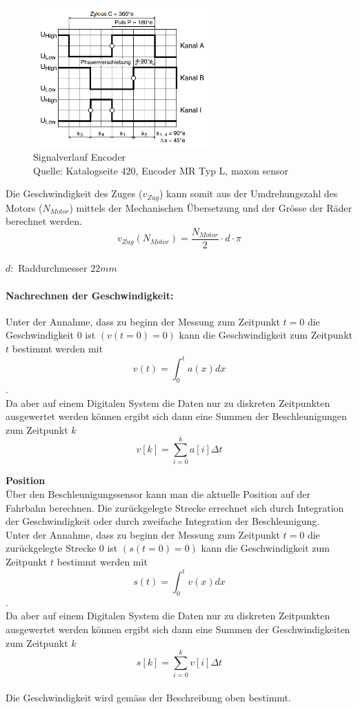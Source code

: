 \documentclass[../../main.tex]{subfiles}
\begin{document}
    \begin{figure}[H]
        \centering
        \includegraphics[width=0.6\textwidth]{Encoder_MR.png}
        \caption {Signalverlauf Encoder \\Quelle: Katalogseite 420, Encoder MR Typ L, maxon sensor}
        \label{fig:et_encoder}
    \end{figure}

    Die Geschwindigkeit des Zuges ($v_{Zug}$) kann somit aus der Umdrehungszahl des Motors ($N_{Motor}$) mittels der Mechanischen Übersetzung und der Grösse der Räder berechnet werden. 
    $$v_{Zug}(N_{Motor}) = \frac{N_{Motor}}{2} \cdot d \cdot \pi$$\\
    $d:$ Raddurchmesser $22mm$\\

    \paragraph{Nachrechnen der Geschwindigkeit:}
    Unter der Annahme, dass zu beginn der Messung zum Zeitpunkt $t = 0$ die Geschwindigkeit $0$ ist $(v(t=0) = 0)$ kann die Geschwindigkeit zum Zeitpunkt $t$ bestimmt werden mit $$v(t) = \int_{0}^{t} a(x) dx$$.\\
    Da aber auf einem Digitalen System die Daten nur zu diskreten Zeitpunkten ausgewertet werden können ergibt sich dann eine Summen der Beschleunigungen zum Zeitpunkt $k$ $$v[k] = \sum_{i=0}^{k}a[i] \Delta t$$ 

    \textbf{Position}\\
    Über den Beschleunigungssensor kann man die aktuelle Position auf der Fahrbahn berechnen. Die zurückgelegte Strecke errechnet sich durch Integration der Geschwindigkeit oder durch zweifache Integration der Beschleunigung.\\
    Unter der Annahme, dass zu beginn der Messung zum Zeitpunkt $t = 0$ die zurückgelegte Strecke $0$ ist $(s(t=0) = 0)$ kann die Geschwindigkeit zum Zeitpunkt $t$ bestimmt werden mit $$s(t) = \int_{0}^{t} v(x) dx$$.\\
    Da aber auf einem Digitalen System die Daten nur zu diskreten Zeitpunkten ausgewertet werden können ergibt sich dann eine Summen der Geschwindigkeiten zum Zeitpunkt $k$ $$s[k] = \sum_{i=0}^{k}v[i] \Delta t$$\\
    Die Geschwindigkeit wird gemäss der Beschreibung oben bestimmt.
\end{document}
